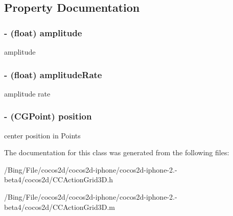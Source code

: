 \subsection{Property Documentation}
\hypertarget{interface_c_c_ripple3_d_a54c3990c3e3f47813baa887b8aa3078a}{
\subsubsection[{amplitude}]{\setlength{\rightskip}{0pt plus 5cm}-\/ (float) {\bf amplitude}}}\label{interface_c_c_ripple3_d_a54c3990c3e3f47813baa887b8aa3078a}
amplitude \hypertarget{interface_c_c_ripple3_d_ae9ec53cba1ee0843189780a7840aa972}{
\subsubsection[{amplitude\-Rate}]{\setlength{\rightskip}{0pt plus 5cm}-\/ (float) {\bf amplitude\-Rate}}}\label{interface_c_c_ripple3_d_ae9ec53cba1ee0843189780a7840aa972}
amplitude rate \hypertarget{interface_c_c_ripple3_d_afa4027c96980cd2b19d58714e951ea33}{
\subsubsection[{position}]{\setlength{\rightskip}{0pt plus 5cm}-\/ (C\-G\-Point) {\bf position}}}\label{interface_c_c_ripple3_d_afa4027c96980cd2b19d58714e951ea33}
center position in Points 

The documentation for this class was generated from the following files\-:\begin{DoxyCompactItemize}
\item 
/\-Bing/\-File/cocos2d/cocos2d-\/iphone/cocos2d-\/iphone-\/2.-\/beta4/cocos2d/C\-C\-Action\-Grid3\-D.\-h\item 
/\-Bing/\-File/cocos2d/cocos2d-\/iphone/cocos2d-\/iphone-\/2.-\/beta4/cocos2d/C\-C\-Action\-Grid3\-D.\-m\end{DoxyCompactItemize}
